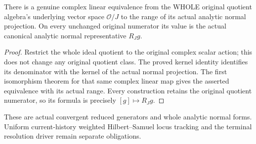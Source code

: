 \begin{theorem}
\label{hir:actual-original-analytic-normal-quotient}
\leanok
There is a genuine complex linear equivalence from the WHOLE original
quotient algebra's underlying vector space $\mathcal O/J$ to the range of
its actual analytic normal projection. On every unchanged original numerator
its value is the actual canonical analytic normal representative $R_Jg$.
\end{theorem}
\begin{proof}
Restrict the whole ideal quotient to the original complex scalar action;
this does not change any original quotient class. The proved kernel identity
identifies its denominator with the kernel of the actual normal projection.
The first isomorphism theorem for that same complex linear map gives the
asserted equivalence with its actual range. Every construction retains the
original quotient numerator, so its formula is precisely $[g]\mapsto R_Jg$.
\end{proof}

These are actual convergent reduced generators and whole analytic normal
forms. Uniform current-history weighted Hilbert--Samuel locus tracking and
the terminal resolution driver remain separate obligations.
